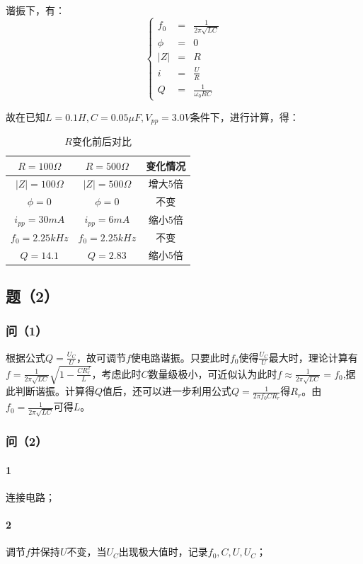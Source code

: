 \documentclass{ctexart}
\begin{document}
  谐振下，有：
$$ \left\{
\begin{aligned}
f_0 & = & \frac{1}{2\pi\sqrt{LC}} \\
\phi & = & 0 \\
|Z| & = & R \\
i & = & \frac {U}{R}\\
Q & = & \frac{1}{\omega_0RC}
\end{aligned}
\right.
$$

故在已知$L=0.1H,C=0.05\mu F,V_{pp}=3.0V$条件下，进行计算，得：
\begin{table}[H]
  \centering
  \caption{$R$变化前后对比}
    \begin{tabular}{c|c|c}
    $R=100\Omega$ & $R=500\Omega$ & 变化情况 \\\hline
    $|Z|=100\Omega$ & $|Z|=500\Omega$ & 增大5倍 \\
    $\phi=0$ & $\phi=0$ & 不变 \\
    $i_{pp}=30mA$ & $i_{pp}=6mA$ & 缩小5倍 \\
    $f_0=2.25kHz$ & $f_0=2.25kHz$ & 不变 \\
    $Q=14.1$ & $Q=2.83$ & 缩小5倍 \\
    \end{tabular}%
  \label{tab:addlabel}%
\end{table}%
\subsection{题（2）}
\subsubsection{问（1）}
根据公式$Q=\frac{U_C}{U}$，故可调节$f$使电路谐振。只要此时$f_0$使得$\frac{U_C}{U}$最大时，理论计算有$f=\frac{1}{2\pi\sqrt{LC}}\sqrt{1-\frac{CR_r^2}{L}}$，考虑此时$C$数量级极小，可近似认为此时$f\approx\frac{1}{2\pi\sqrt{LC}}=f_0$,据此判断谐振。计算得$Q$值后，还可以进一步利用公式$Q=\frac{1}{2\pi f_0CR_r}$得$R_r$。由$f_0=\frac{1}{2\pi\sqrt{LC}}$可得$L$。
\subsubsection{问（2）}
\paragraph{1}连接电路；
\paragraph{2}调节$f$并保持$U$不变，当$U_C$出现极大值时，记录$f_0,C,U,U_C$；
\end{document}
